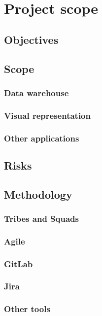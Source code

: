 
\chapter{Project scope}

\label{chapter03}

\section{Objectives}

\section{Scope}

\subsection{Data warehouse}

\subsection{Visual representation}

\subsection{Other applications}

\section{Risks}

\section{Methodology}

\subsection{Tribes and Squads}

\subsection{Agile}

\subsection{GitLab}

\subsection{Jira}

\subsection{Other tools}